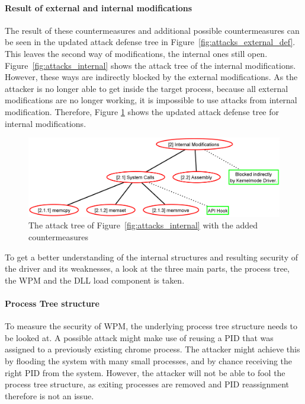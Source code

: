 \paragraph{Result of external and internal modifications}
The result of these countermeasures and additional possible countermeasures can be seen in the updated attack defense tree in Figure~\ref{fig:attacks_external_def}. This leaves the second way of modifications, the internal ones still open. Figure~\ref{fig:attacks_internal} shows the attack tree of the internal modifications. However, these ways are indirectly blocked by the external modifications. As the attacker is no longer able to get inside the target process, because all external modifications are no longer working, it is impossible to use attacks from internal modification. Therefore, Figure \ref{fig:attacks_internal_def} shows the updated attack defense tree for internal modifications.
\begin{figure}[h]
\centering
\includegraphics[scale=0.25]{sections/adtrees/InternalModifications.png}
\caption{The attack tree of Figure~\ref{fig:attacks_internal} with the added countermeasures}
\label{fig:attacks_internal_def}
\end{figure}
To get a better understanding of the internal structures and resulting security of the driver and its weaknesses, a look at the three main parts, the process tree, the \gls{WPM} and the \gls{DLL} load component is taken.

\paragraph{Process Tree structure}
To measure the security of \gls{WPM}, the underlying process tree structure needs to be looked at.
A possible attack might make use of reusing a \gls{PID} that was assigned to a previously existing chrome process. The attacker might achieve this by flooding the system with many small processes, and by chance receiving the right \gls{PID} from the system. However, the attacker will not be able to fool the process tree structure, as exiting processes are removed and \gls{PID} reassignment therefore is not an issue. 

